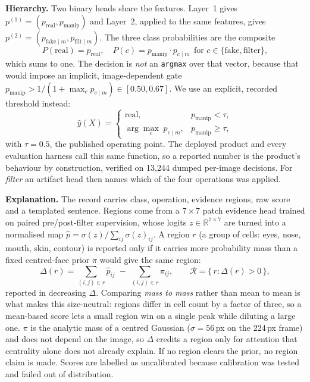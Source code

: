 \documentclass[conference]{IEEEtran}
\begin{document}
\textbf{Hierarchy.} Two binary heads share the features. Layer~1 gives
$p^{(1)}=(p_{\mathrm{real}}, p_{\mathrm{manip}})$ and Layer~2, applied to the same features,
gives $p^{(2)}=(p_{\mathrm{fake}\mid m}, p_{\mathrm{filt}\mid m})$. The three class
probabilities are the composite
\begin{equation}
P(\mathrm{real})=p_{\mathrm{real}},\quad
P(c)=p_{\mathrm{manip}}\cdot p_{c\mid m}\ \ \text{for } c\in\{\mathrm{fake},\mathrm{filter}\},
\end{equation}
which sums to one. The decision is \emph{not} an \texttt{argmax} over that vector, because
that would impose an implicit, image-dependent gate
$p_{\mathrm{manip}} > 1/(1+\max_c p_{c\mid m}) \in [0.50, 0.67]$. We use an explicit,
recorded threshold instead:
\begin{equation}
\hat{y}(X) =
\begin{cases}
\mathrm{real}, & p_{\mathrm{manip}} < \tau,\\[2pt]
\arg\max_{c} \; p_{c\mid m}, & p_{\mathrm{manip}} \ge \tau,
\end{cases}
\label{eq:rule}
\end{equation}
with $\tau = 0.5$, the published operating point. The deployed product and every evaluation
harness call this same function, so a reported number is the product's behaviour by
construction, verified on 13{,}244 dumped per-image decisions. For \emph{filter} an artifact
head then names which of the four operations was applied.

\textbf{Explanation.} The record carries class, operation, evidence regions, raw score and a
templated sentence. Regions come from a $7\times7$ patch evidence head trained on paired
pre/post-filter supervision, whose logits $z\in\mathbb{R}^{7\times7}$ are turned into a
normalised map $\hat{p} = \sigma(z)/\sum_{ij}\sigma(z)_{ij}$. A region $r$ (a group of cells:
eyes, nose, mouth, skin, contour) is reported only if it carries more probability mass than a
fixed centred-face prior $\pi$ would give the same region:
\begin{equation}
\Delta(r) = \sum_{(i,j)\in r}\hat{p}_{ij} \;-\; \sum_{(i,j)\in r}\pi_{ij}, \qquad
\mathcal{R} = \{\, r : \Delta(r) > 0 \,\},
\label{eq:region}
\end{equation}
reported in decreasing $\Delta$. Comparing \emph{mass to mass} rather than mean to mean is
what makes this size-neutral: regions differ in cell count by a factor of three, so a
mean-based score lets a small region win on a single peak while diluting a large one. $\pi$ is
the analytic mass of a centred Gaussian ($\sigma=56$\,px on the 224\,px frame) and does not
depend on the image, so $\Delta$ credits a region only for attention that centrality alone does
not already explain. If no region clears the prior, no region claim is made. Scores are
labelled as uncalibrated because calibration was tested and failed out of distribution.
\end{document}
